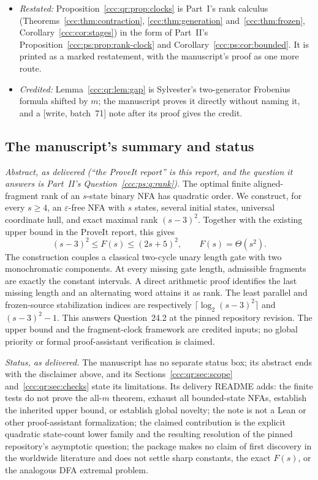 \documentclass[11pt,letterpaper]{article}
\theoremstyle{definition}
\theoremstyle{remark}
\newcommand{\eps}{\varepsilon}
\newcommand{\wsevone}{\textup{[write, batch~71]}}
\newcommand{\waddsevthree}[1]{\textup{[}Added 1 October 2026, batch~73: #1\textup{]}}
\begin{document}
\begin{itemize}[leftmargin=1.4em,itemsep=1pt]
 Question~\ref{ccc:ps:q:dfa} on the decision complexity for DFA input, Part~I's
 questions and Part~III's questions are untouched.
 \waddsevthree{Both DFA questions are answered in Part~VI.}
\item \emph{Restated:} Proposition~\ref{ccc:qr:prop:clocks} is Part~I's rank
 calculus (Theorems~\ref{ccc:thm:contraction}, \ref{ccc:thm:generation}
 and~\ref{ccc:thm:frozen}, Corollary~\ref{ccc:cor:stages}) in the form of
 Part~II's Proposition~\ref{ccc:ps:prop:rank-clock} and
 Corollary~\ref{ccc:ps:cor:bounded}. It is printed as a marked restatement,
 with the manuscript's proof as one more route.
\item \emph{Credited:} Lemma~\ref{ccc:qr:lem:gap} is Sylvester's
 two-generator Frobenius formula shifted by $m$; the manuscript proves it
 directly without naming it, and a \wsevone{} note after its proof gives the
 credit.
\end{itemize}

\subsection{The manuscript's summary and status}\label{ccc:qr:sec:abstract}

\emph{Abstract, as delivered (``the ProveIt report'' is this report, and
the question it answers is Part~II's Question~\ref{ccc:ps:q:rank}).} The
optimal finite aligned-fragment rank of an $s$-state binary NFA has quadratic
order. We construct, for every $s\ge4$, an $\eps$-free NFA with $s$ states,
several initial states, universal coordinate hull, and exact maximal rank
$(s-3)^2$. Together with the existing upper bound in the ProveIt report, this
gives
\[
(s-3)^2\le F(s)\le(2s+5)^2,
\qquad F(s)=\Theta(s^2).
\]
The construction couples a classical two-cycle unary length gate with two
monochromatic components. At every missing gate length, admissible fragments
are exactly the constant intervals. A direct arithmetic proof identifies the
last missing length and an alternating word attains it as rank. The least
parallel and frozen-source stabilization indices are respectively
$\lceil\log_2 (s-3)^2\rceil$ and $(s-3)^2-1$. This answers Question~24.2 at
the pinned repository revision. The upper bound and the fragment-clock
framework are credited inputs; no global priority or formal
proof-assistant verification is claimed.

\emph{Status, as delivered.} The manuscript has no separate status box; its
abstract ends with the disclaimer above, and its Sections~\ref{ccc:qr:sec:scope}
and~\ref{ccc:qr:sec:checks} state its limitations. Its delivery README adds:
the finite tests do not prove the all-$m$ theorem, exhaust all bounded-state
NFAs, establish the inherited upper bound, or establish global novelty; the
note is not a Lean or other proof-assistant formalization; the claimed
contribution is the explicit quadratic state-count lower family and the
resulting resolution of the pinned repository's asymptotic question; the
package makes no claim of first discovery in the worldwide literature and
does not settle sharp constants, the exact $F(s)$, or the analogous DFA
extremal problem.
\end{document}

